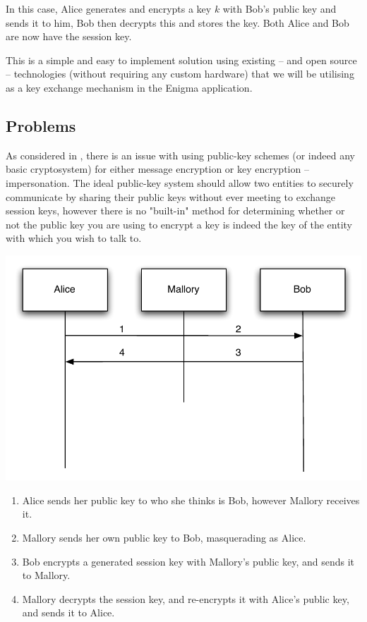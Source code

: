 In this case, Alice generates and encrypts a key $k$ with Bob's public key and sends it to him, Bob then decrypts this and stores the key. Both Alice and Bob are now have the session key.

This is a simple and easy to implement solution using existing -- and open source -- technologies (without requiring any custom hardware) that we will be utilising as a key exchange mechanism in the Enigma application.

\subsection{Problems}

As considered in \emph{}, there is an issue with using public-key schemes (or indeed any basic cryptosystem) for either message encryption or key encryption -- impersonation. The ideal public-key system should allow two entities to securely communicate by sharing their public keys without ever meeting to exchange session keys, however there is no "built-in" method for determining whether or not the public key you are using to encrypt a key is indeed the key of the entity with which you wish to talk to. 

\begin{center}
  \includegraphics[scale=0.6]{./Figures/3-7-1.pdf}
\end{center}

\begin{enumerate}
  \item Alice sends her public key to who she thinks is Bob, however Mallory receives it.
  \item Mallory sends her own public key to Bob, masquerading as Alice.
  \item Bob encrypts a generated session key with Mallory's public key, and sends it to Mallory.
  \item Mallory decrypts the session key, and re-encrypts it with Alice's public key, and sends it to Alice.
\end{enumerate}

